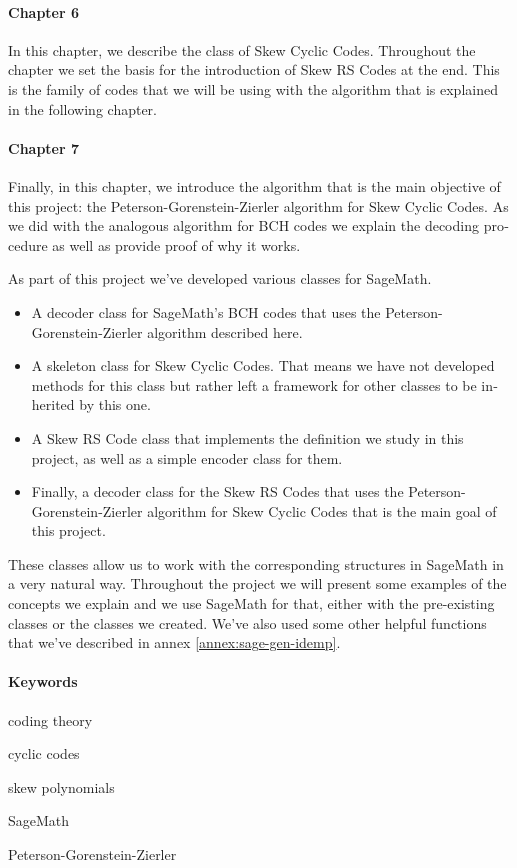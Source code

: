 \begin{otherlanguage}{english}
\paragraph{Chapter 6} In this chapter, we describe the class of Skew Cyclic Codes.
Throughout the chapter we set the basis for the introduction of Skew RS Codes at the end.
This is the family of codes that we will be using with the algorithm that is explained in the following chapter.

\paragraph{Chapter 7} Finally, in this chapter, we introduce the algorithm that is the main objective of this project: the Peterson-Gorenstein-Zierler algorithm for Skew Cyclic Codes.
As we did with the analogous algorithm for BCH codes we explain the decoding procedure as well as provide proof of why it works.

As part of this project we've developed various classes for SageMath.
\begin{itemize}
  \item A decoder class for SageMath's BCH codes that uses the Peterson-Gorenstein-Zierler algorithm described here.
  \item A skeleton class for Skew Cyclic Codes. That means we have not developed methods for this class but rather left a framework for other classes to be inherited by this one.
  \item A Skew RS Code class that implements the definition we study in this project, as well as a simple encoder class for them.
  \item Finally, a decoder class for the Skew RS Codes that uses the Peterson-Gorenstein-Zierler algorithm for Skew Cyclic Codes that is the main goal of this project.
\end{itemize}

These classes allow us to work with the corresponding structures in SageMath in a very natural way.
Throughout the project we will present some examples of the concepts we explain and we use SageMath for that, either with the pre-existing classes or the classes we created.
We've also used some other helpful functions that we've described in annex \ref{annex:sage-gen-idemp}.

\paragraph{Keywords}
\begin{itemize*}[label=,itemsep=4em,itemjoin=\hspace{2em}]
  \item coding theory
  \item cyclic codes 
  \item skew polynomials
  \item SageMath
  \item Peterson-Gorenstein-Zierler
\end{itemize*}

\end{otherlanguage}